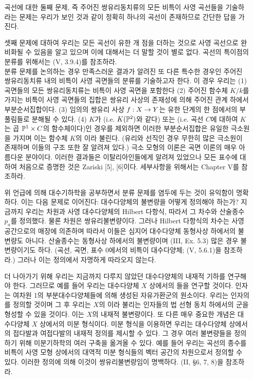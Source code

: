 	곡선에 대한 둘째 문제, 즉 주어진 쌍유리동치류의 모든 비특이 사영 곡선들을 기술하라는 문제는
	우리가 보인 것과 같이 정확히 하나의 곡선이 존재하므로 간단한 답을 가진다.
	
	셋째 문제에 대하여 우리는 모든 곡선이 유한 개 점을 더하는 것으로 사영 곡선으로 완비화될 수 있음을 알고 있으며
	이에 대해서는 더 말할 것이 별로 없다. 곡선의 특이점의 분류를 위해서는 (V, 3.9.4)를 참조하라.\\
	
	
	분류 문제를 논의하는 경우 만족스러운 결과가 알려진 또 다른 특수한 경우인
	주어진 쌍유리동치류 내의 비특이 사영 곡면들의 분류를 기술하고자 한다.
	이 경우 우리는 (1) 곡면들의 모든 쌍유리동치류는 비특이 사영 곡면을 포함한다
	(2) 주어진 함수체 $K/k$를 가지는 비특이 사영 곡면들의 집합은 쌍유리 사상의 존재성에 의해 주어진 관계 하에서 부분순서집합이다.
	(3) 임의의 쌍유리 사상 $f:X\rightarrow Y$는 유한 단계의 한 점에서의 부풀림들로 분해될 수 있다.
	(4) $K$가 (i.e. $K(\mathbb{P}^2)$와 같다) 또는 %
	(i.e. 곡선 $C$에 대하여 $K$는 곱 $\mathbb{P}^1\times C$의 함수체이다)인 경우를 제외하면
	이러한 부분순서집합은 유일한 극소원을 가지며 이는 함수체 $K$의 이라 불린다.
	(유리와 선직인 경우 무한히 많은 극소원이 존재하며 이들의 구조 또한 잘 알려져 있다.)
	극소 모형의 이론은 곡면 이론의 매우 아름다운 분야이다.
	이러한 결과들은 이탈리아인들에게 알려져 있었으나 모든 표수에 대하여 처음으로 증명한 것은 Zariski [5], [6]이다.
	세부사항을 위해서는 Chapter V를 참조하라.
	
	위 언급에 의해 대수기하학을 공부하면서 분류 문제를 염두에 두는 것이 유익함이 명확하다.
	이는 다음 문제로 이어진다: 대수다양체의 불변량을 어떻게 정의해야 하는가?
	지금까지 우리는 차원과 사영 대수다양체의 Hilbert 다항식, 따라서 그 차수와 산술종수 $p_a$를 정의했다.
	물론 차원은 쌍유리불변량이다. 그러나 Hilbert 다항식의 차수는 사영공간으로의 매장에 의존하며
	따라서 이들은 심지어 대수다양체 동형사상 하에서의 불변량도 아니다.
	산술종수는 동형사상 하에서의 불변량이며 (III, Ex. 5.3) 많은 경우 불변량이기도 하다.
	(곡선, 곡면, 표수 0에서의 비특이 대수다양체; (V, 5.6.1)을 참조하라.) 그러나 이는 정의에서 자명하게 따라오지 않는다.
	
	더 나아가기 위해 우리는 지금까지 다루지 않았던 대수다양체의 내재적 기하를 연구해야 한다.
	그러므로 예를 들어 우리는 대수다양체 $X$ 상에서의 들을 연구할 것이다.
	인자는 여차원 1의 부분대수다양체들에 의해 생성된 자유가환군의 원소이다.
	우리는 인자의 를 정의할 것이며 그 후 우리는 $X$의 이라 불리는
	인자들의 법 선형 동치 하에서의 군을 형성할 수 있을 것이다. 이는 $X$의 내재적 불변량이다.
	또 다른 매우 중요한 개념은 대수다양체 $X$ 상에서의 미분 형식이다.
	미분 형식을 이용하면 우리는 대수다양체 상에서의 접다발과 여접다발의 내재적 정의를 제시할 수 있다.
	그 경우 여러 불변량들을 정의하기 위해 미분기하학의 여러 구축을 옮겨올 수 있다.
	예를 들어 우리는 곡선의 종수를 비특이 사영 모형 상에서의 대역적 미분 형식들의 벡터 공간의 차원으로서 정의할 수 있다.
	이러한 정의에 의해 이것이 쌍유리불변량임이 명백하다. (II, \S 6, 7, 8)을 참조하라.
	
